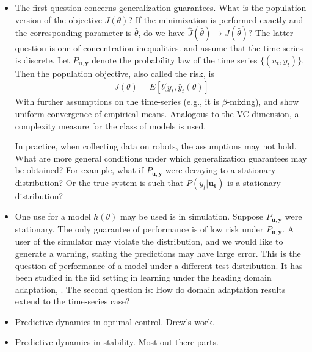 \documentclass[a4paper, 11pt]{article}
\begin{document}
\begin{itemize}
\item The first question concerns generalization guarantees. What is the
  population version of the objective $J(\theta)$? If the minimization is
  performed exactly and the corresponding parameter is $\hat{\theta}$, do we
  have $\hat{J}(\hat{\theta}) \rightarrow J(\hat{\theta})$? The latter question
  is one of concentration inequalities. \cite{vidyasagar} and \cite{dmd} assume
  that the time-series is discrete. Let $P_{\bm{u,y}}$ denote the probability
  law of the time series $\{(u_t,y_t)\}$. Then the population objective, also
  called the risk, is
  \begin{align*}
    J(\theta) = E[l(y_t,\hat{y}_t(\theta)]
  \end{align*}
  With further assumptions on the time-series (e.g., it is $\beta$-mixing),
  \cite{vidyasagar} and \cite{dmd} show uniform convergence of empirical
  means. Analogous to the VC-dimension, a complexity measure for the class of
  models is used. 

  In practice, when collecting data on robots, the assumptions may not
  hold. What are more general conditions under which generalization guarantees
  may be obtained? For example, what if $P_{\bm{u,y}}$ were decaying to a
  stationary distribution? Or the true system is such that $P(y_t|\bm{u_t})$ is
  a stationary distribution?

\item One use for a model $h(\theta)$ may be used is in simulation. Suppose
  $P_{\bm{u,y}}$ were stationary. The only guarantee of performance is of low
  risk under $P_{\bm{u,y}}$. A user of the simulator may violate the
  distribution, and we would like to generate a warning, stating the predictions
  may have large error. This is the question of performance of a model under a
  different test distribution. It has been studied in the iid setting in
  learning under the heading domain adaptation, \cite{bendavid}. The second
  question is: How do domain adaptation results extend to the time-series case?

\item Predictive dynamics in optimal control. Drew's work.

\item Predictive dynamics in stability. Most out-there parts.
\end{itemize}
\end{document}
